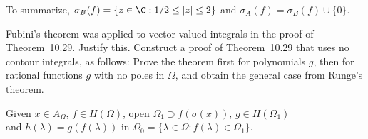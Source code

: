 \begin{enumerate}
To summarize, \(\sigma_B(f) = \{z\in \C: 1/2 \leq |z| \leq 2\}\)
and  \(\sigma_A(f) = \sigma_B(f) \cup \{0\}\).

\begin{excopy}
\begin{itemize}
Fubini’s theorem was applied to vector-valued integrals in the proof of
Theorem~10.29. Justify this.
Construct a proof of Theorem~10.29 that uses no contour integrals, as
follows: Prove the theorem first for polynomials $g$, then for rational
  functions
  $g$ with no poles in \(\Omega\), and obtain the general case from Runge’s
  theorem.
\end{itemize}
\end{excopy}

Given \(x\in A_\Omega\), \(f\in H(\Omega)\),
open \(\Omega_1 \supset f(\sigma(x))\),
\(g\in H(\Omega_1)\)\\
and \(h(\lambda)=g(f(\lambda))\)
in \hbox{\(\Omega_0 = \{\lambda \in \Omega: f(\lambda) \in \Omega_1\}\)}.


\end{enumerate}
